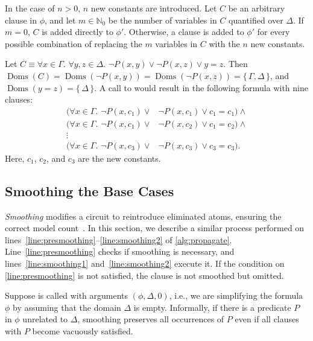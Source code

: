 \documentclass[a4paper,UKenglish,cleveref, autoref, thm-restate]{lipics-v2021}
\DeclareMathOperator{\Doms}{Doms}
\begin{document}
In the case of $n>0$, $n$ new constants are introduced. Let $C$ be an arbitrary
clause in $\phi$, and let $m \in \mathbb{N}_{0}$ be the number of variables in
$C$ quantified over $\Delta$. If $m=0$, $C$ is added directly to $\phi'$.
Otherwise, a clause is added to $\phi'$ for every possible combination of
replacing the $m$ variables in $C$ with the $n$ new constants.

\begin{example}
  Let $C \equiv \forall x \in \Gamma\text{. }\forall y, z \in \Delta\text{.
  } \neg P(x, y) \lor \neg P(x, z) \lor y=z$. Then
  $\Doms(C) = \Doms(\neg P(x, y)) = \Doms(\neg P(x, z)) = \{\, \Gamma, \Delta \,\}$,
  and $\Doms(y=z) = \{\, \Delta \,\}$. A call to  would result in the following formula with nine clauses:
  \begin{align*}
    (\forall x \in \Gamma\text{. }\neg P(x, c_{1}) \lor& \neg P(x, c_{1}) \lor c_{1}=c_{1})\land{}\\
    (\forall x \in \Gamma\text{. }\neg P(x, c_{1}) \lor& \neg P(x, c_{2}) \lor c_{1}=c_{2})\land{}\\
    \vdots&\\
    (\forall x \in \Gamma\text{. }\neg P(x, c_{3}) \lor& \neg P(x, c_{3}) \lor c_{3}=c_{3}).
  \end{align*}
  Here, $c_{1}$, $c_{2}$, and $c_{3}$ are the new constants.
\end{example}

\subsection{Smoothing the Base Cases}\label{sec:smoothing}

\emph{Smoothing} modifies a circuit to reintroduce eliminated atoms, ensuring
the correct model
count~\cite{darwiche2001tractable,DBLP:conf/ijcai/BroeckTMDR11}. In this
section, we describe a similar process performed on
lines~\ref{line:presmoothing}--\ref{line:smoothing2} of \cref{alg:propagate}.
Line~\ref{line:presmoothing} checks if smoothing is necessary, and
lines~\ref{line:smoothing1} and~\ref{line:smoothing2} execute it. If the
condition on \autoref{line:presmoothing} is not satisfied, the clause is not
smoothed but omitted.

Suppose \Propagate is called with arguments $(\phi, \Delta, 0)$, i.e., we are
simplifying the formula $\phi$ by assuming that the domain $\Delta$ is empty.
Informally, if there is a predicate $P$ in $\phi$ unrelated to $\Delta$,
smoothing preserves all occurrences of $P$ even if all clauses with $P$ become
vacuously satisfied.
\end{document}
